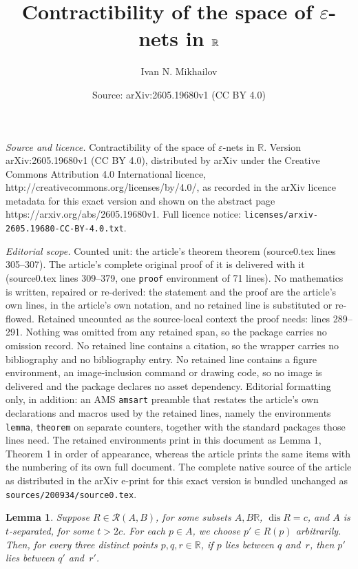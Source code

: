 \documentclass[10pt,a4paper]{amsart}
\title{Contractibility of the space of $\varepsilon$-nets in $\R$}
\author{Ivan N. Mikhailov}
\date{Source: arXiv:2605.19680v1 (CC BY 4.0)}
\newtheorem{lemma}{Lemma}
\newcommand{\R}{\mathbb{R}}
\newcommand{\dis}{\operatorname{dis}}
\begin{document}
\maketitle

\noindent\emph{Source and licence.} Contractibility of the space of $\varepsilon$-nets in $\R$. Version arXiv:2605.19680v1 (CC BY 4.0), distributed by arXiv under the Creative Commons Attribution 4.0 International licence, http://creativecommons.org/licenses/by/4.0/, as recorded in the arXiv licence metadata for this exact version and shown on the abstract page https://arxiv.org/abs/2605.19680v1. Full licence notice: \texttt{licenses/arxiv-2605.19680-CC-BY-4.0.txt}.\par\smallskip

\noindent\textit{Editorial scope.} Counted unit: the article's theorem theorem (source0.tex lines 305--307). The article's complete original proof of it is delivered with it (source0.tex lines 309--379, one \texttt{proof} environment of 71 lines). No mathematics is written, repaired or re-derived: the statement and the proof are the article's own lines, in the article's own notation, and no retained line is substituted or re-flowed.  Retained uncounted as the source-local context the proof needs: lines 289--291.  Nothing was omitted from any retained span, so the package carries no omission record.  No retained line contains a citation, so the wrapper carries no bibliography and no bibliography entry.  No retained line contains a figure environment, an image-inclusion command or drawing code, so no image is delivered and the package declares no asset dependency.  Editorial formatting only, in addition: an AMS \texttt{amsart} preamble that restates the article's own declarations and macros used by the retained lines, namely the environments \texttt{lemma}, \texttt{theorem} on separate counters, together with the standard packages those lines need.  The retained environments print in this document as Lemma 1, Theorem 1 in order of appearance, whereas the article prints the same items with the numbering of its own full document.  The complete native source of the article as distributed in the arXiv e-print for this exact version is bundled unchanged as \texttt{sources/200934/source0.tex}.
\begin{lemma}\label{lemma: transfer_separated}
Suppose $R\in\mathcal{R}(A, B)$, for some subsets $A,B\R$, $\dis R = c$, and $A$ is $t$-separated, for some $t > 2c$. For each $p\in A$, we choose $p'\in R(p)$ arbitrarily. Then, for every three distinct points $p, q, r\in \R$, if $p$ lies between $q$ and~$r$, then $p'$ lies between $q'$ and~$r'$.
\end{lemma}
\end{document}
